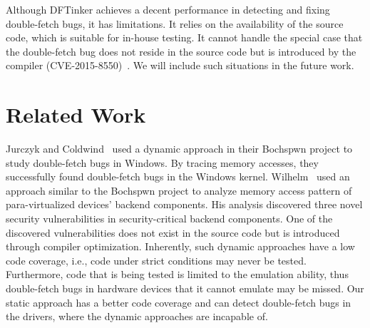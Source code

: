 \documentclass[10pt]{llncs}
\begin{document}
Although DFTinker achieves a decent performance in detecting and fixing double-fetch bugs, it has limitations. It relies on the availability of the source code, which is suitable for in-house testing. It cannot handle the special case that the double-fetch bug does not reside in the source code but is introduced by the compiler (CVE-2015-8550)~\cite{wilhelm15tracing}. We will include such situations in the future work. 





\section{Related Work}
\label{related}



Jurczyk and Coldwind~\cite{bochspwn,jurczyk2013identifying} used a dynamic approach in their Bochspwn project to study double-fetch bugs in Windows. By tracing memory accesses, they successfully found double-fetch bugs in the Windows kernel. Wilhelm~\cite{wilhelm15tracing} used an approach similar to the
Bochspwn project to analyze memory access pattern of para-virtualized
devices' backend components. His analysis discovered three novel security
vulnerabilities in security-critical backend components. One of the
discovered vulnerabilities does not exist in the source code but is
introduced through compiler optimization.
Inherently, such dynamic approaches have a low code coverage, i.e., code under strict conditions may never be tested. Furthermore, code that is being tested is limited to the emulation ability, thus double-fetch bugs in hardware devices that it cannot emulate may be missed. Our static approach has a better code coverage and can detect double-fetch bugs in the drivers, where the dynamic approaches are incapable of.
\end{document}
